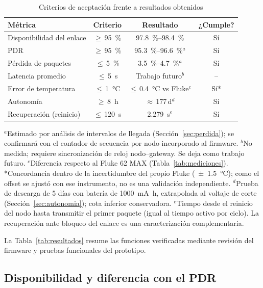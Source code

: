 \documentclass[conference]{IEEEtran}
\begin{document}
\begin{table}[!t]
\caption{Criterios de aceptación frente a resultados obtenidos}
\label{tab:criterios}
\centering
\footnotesize
\begin{tabularx}{\columnwidth}{@{}Xccc@{}}
\toprule
\textbf{Métrica} & \textbf{Criterio} & \textbf{Resultado} & \textbf{¿Cumple?} \\
\midrule
Disponibilidad del enlace & $\geq$\,\SI{95}{\percent} & \SIrange{97.8}{98.4}{\percent} & Sí \\
PDR & $\geq$\,\SI{95}{\percent} & \SIrange{95.3}{96.6}{\percent}$^{a}$ & Sí \\
Pérdida de paquetes & $\leq$\,\SI{5}{\percent} & \SIrange{3.5}{4.7}{\percent}$^{a}$ & Sí \\
Latencia promedio & $\leq$\,\SI{5}{\second} & Trabajo futuro$^{b}$ & -- \\
Error de temperatura & $\leq$\,\SI{1}{\celsius} & $\leq$\,\SI{0.4}{\celsius} vs Fluke$^{c}$ & Sí* \\
Autonomía & $\geq$\,\SI{8}{\hour} & $\approx$\,\num{177}\,d$^{d}$ & Sí \\
Recuperación (reinicio) & $\leq$\,\SI{120}{\second} & \SI{2.279}{\second}$^{e}$ & Sí \\
\bottomrule
\end{tabularx}
\vskip 0.15cm
{\footnotesize $^{a}$Estimado por análisis de intervalos de llegada (Sección~\ref{sec:perdida}); se confirmará con el contador de secuencia por nodo incorporado al firmware. $^{b}$No medida; requiere sincronización de reloj nodo--gateway. Se deja como trabajo futuro. $^{c}$Diferencia respecto al Fluke 62 MAX (Tabla~\ref{tab:mediciones}). *Concordancia dentro de la incertidumbre del propio Fluke (\SI{\pm 1.5}{\celsius}); como el offset se ajustó con ese instrumento, no es una validación independiente. $^{d}$Prueba de descarga de \num{5} días con batería de \SI{1000}{\milli\ampere\hour}, extrapolada al voltaje de corte (Sección~\ref{sec:autonomia}); cota inferior conservadora. $^{e}$Tiempo desde el reinicio del nodo hasta transmitir el primer paquete (igual al tiempo activo por ciclo). La recuperación ante bloqueo del enlace es una caracterización complementaria.}
\end{table}

La Tabla~\ref{tab:resultados} resume las funciones verificadas mediante revisión del firmware y pruebas funcionales del prototipo.

\subsection{Disponibilidad y diferencia con el PDR}
\end{document}
